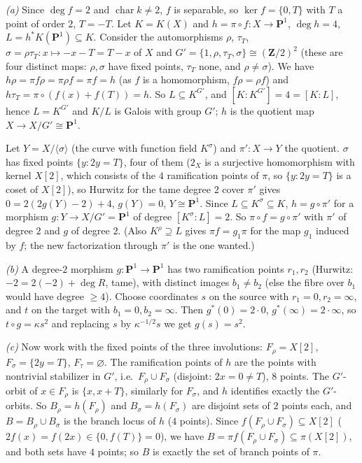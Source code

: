 \documentclass[11pt]{article}
\begin{document}
\emph{(a)} Since $\deg f=2$ and $\operatorname{char}k\ne2$, $f$ is separable, so $\ker f=\{0,T\}$ with $T$ a point of order $2$, $T=-T$. Let $K=K(X)$ and $h=\pi\circ f:X\to\mathbf P^1$, $\deg h=4$, $L=h^*K(\mathbf P^1)\subseteq K$. Consider the automorphisms $\rho$, $\tau_T$, $\sigma=\rho\tau_T:x\mapsto -x-T=T-x$ of $X$ and $G'=\{1,\rho,\tau_T,\sigma\}\cong(\mathbf Z/2)^2$ (these are four distinct maps: $\rho,\sigma$ have fixed points, $\tau_T$ none, and $\rho\ne\sigma$). We have $h\rho=\pi f\rho=\pi\rho f=\pi f=h$ (as $f$ is a homomorphism, $f\rho=\rho f$) and $h\tau_T=\pi\circ(f(x)+f(T))=h$. So $L\subseteq K^{G'}$, and $[K:K^{G'}]=4=[K:L]$, hence $L=K^{G'}$ and $K/L$ is Galois with group $G'$; $h$ is the quotient map $X\to X/G'\cong\mathbf P^1$.

Let $Y=X/\langle\sigma\rangle$ (the curve with function field $K^\sigma$) and $\pi':X\to Y$ the quotient. $\sigma$ has fixed points $\{y:2y=T\}$, four of them ($2_X$ is a surjective homomorphism with kernel $X[2]$, which consists of the $4$ ramification points of $\pi$, so $\{y:2y=T\}$ is a coset of $X[2]$), so Hurwitz for the tame degree $2$ cover $\pi'$ gives $0=2(2g(Y)-2)+4$, $g(Y)=0$, $Y\cong\mathbf P^1$. Since $L\subseteq K^\sigma\subseteq K$, $h=g\circ\pi'$ for a morphism $g:Y\to X/G'=\mathbf P^1$ of degree $[K^\sigma:L]=2$. So $\pi\circ f=g\circ\pi'$ with $\pi'$ of degree $2$ and $g$ of degree $2$. (Also $K^{\rho}\supseteq L$ gives $\pi f=g_1\pi$ for the map $g_1$ induced by $f$; the new factorization through $\pi'$ is the one wanted.)

\emph{(b)} A degree-$2$ morphism $g:\mathbf P^1\to\mathbf P^1$ has two ramification points $r_1,r_2$ (Hurwitz: $-2=2(-2)+\deg R$, tame), with distinct images $b_1\ne b_2$ (else the fibre over $b_1$ would have degree $\ge4$). Choose coordinates $s$ on the source with $r_1=0,r_2=\infty$, and $t$ on the target with $b_1=0,b_2=\infty$. Then $g^*(0)=2\cdot0$, $g^*(\infty)=2\cdot\infty$, so $t\circ g=\kappa s^2$ and replacing $s$ by $\kappa^{-1/2}s$ we get $g(s)=s^2$.

\emph{(c)} Now work with the fixed points of the three involutions: $F_\rho=X[2]$, $F_\sigma=\{2y=T\}$, $F_{\tau}=\varnothing$. The ramification points of $h$ are the points with nontrivial stabilizer in $G'$, i.e.\ $F_\rho\cup F_\sigma$ (disjoint: $2x=0\ne T$), $8$ points. The $G'$-orbit of $x\in F_\rho$ is $\{x,x+T\}$, similarly for $F_\sigma$, and $h$ identifies exactly the $G'$-orbits. So $B_\rho=h(F_\rho)$ and $B_\sigma=h(F_\sigma)$ are disjoint sets of $2$ points each, and $B=B_\rho\cup B_\sigma$ is the branch locus of $h$ ($4$ points). Since $f(F_\rho\cup F_\sigma)\subseteq X[2]$ ($2f(x)=f(2x)\in\{0,f(T)\}=0$), we have $B=\pi f(F_\rho\cup F_\sigma)\subseteq\pi(X[2])$, and both sets have $4$ points; so $B$ is exactly the set of branch points of $\pi$.
\end{document}
